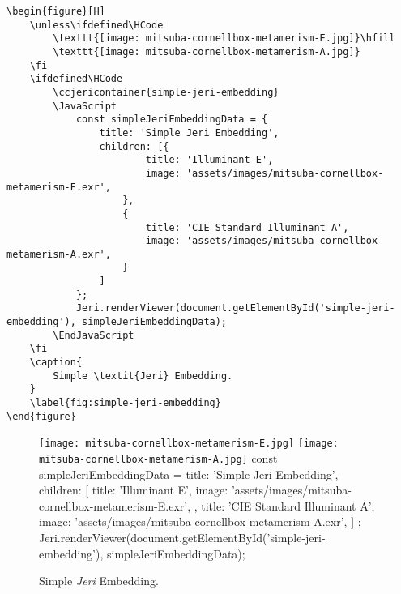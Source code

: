 \begin{lstlisting}[caption={Simple \textit{Jeri} Embedding.}]
\begin{figure}[H]
    \unless\ifdefined\HCode
        \texttt{[image: mitsuba-cornellbox-metamerism-E.jpg]}\hfill
        \texttt{[image: mitsuba-cornellbox-metamerism-A.jpg]}
    \fi
    \ifdefined\HCode
        \ccjericontainer{simple-jeri-embedding}
        \JavaScript
            const simpleJeriEmbeddingData = {
                title: 'Simple Jeri Embedding',
                children: [{
                        title: 'Illuminant E',
                        image: 'assets/images/mitsuba-cornellbox-metamerism-E.exr',
                    },
                    {
                        title: 'CIE Standard Illuminant A',
                        image: 'assets/images/mitsuba-cornellbox-metamerism-A.exr',
                    }
                ]
            };
            Jeri.renderViewer(document.getElementById('simple-jeri-embedding'), simpleJeriEmbeddingData);
        \EndJavaScript
    \fi
    \caption{
        Simple \textit{Jeri} Embedding.
    }
    \label{fig:simple-jeri-embedding}
\end{figure}
\end{lstlisting}

\begin{figure}[H]
    \unless\ifdefined\HCode
        \texttt{[image: mitsuba-cornellbox-metamerism-E.jpg]}\hfill
        \texttt{[image: mitsuba-cornellbox-metamerism-A.jpg]}
    \fi
    \ifdefined\HCode
        \JavaScript
            const simpleJeriEmbeddingData = {
                title: 'Simple Jeri Embedding',
                children: [{
                        title: 'Illuminant E',
                        image: 'assets/images/mitsuba-cornellbox-metamerism-E.exr',
                    },
                    {
                        title: 'CIE Standard Illuminant A',
                        image: 'assets/images/mitsuba-cornellbox-metamerism-A.exr',
                    }
                ]
            };
            Jeri.renderViewer(document.getElementById('simple-jeri-embedding'), simpleJeriEmbeddingData);
        \EndJavaScript
    \fi
    \caption{
        Simple \textit{Jeri} Embedding.
    }
    \label{fig:simple-jeri-embedding}
\end{figure}

